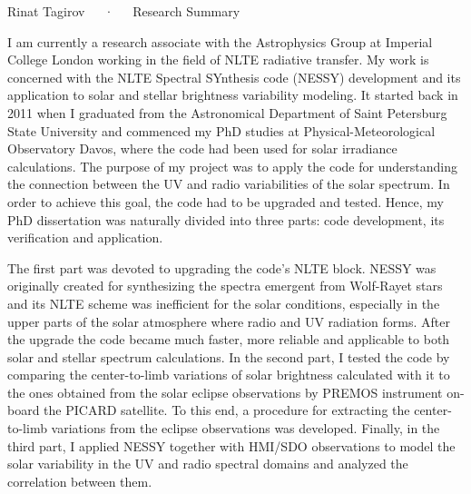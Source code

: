 \documentclass[11pt, a4paper]{awesome-cv}
\begin{document}

\makecvfooter
  {}
  {Rinat Tagirov~~~·~~~Research Summary}
  {}


\begin{cvletter}


I am currently a research associate with the Astrophysics Group at Imperial College London
working in the field of NLTE radiative transfer.
My work is concerned with the NLTE Spectral SYnthesis code (NESSY) development and its application to
solar and stellar brightness variability modeling.
It started back in 2011 when I graduated from the Astronomical Department of Saint Petersburg State University
and commenced my PhD studies at Physical-Meteorological Observatory Davos,
where the code had been used for solar irradiance calculations.
The purpose of my project was to apply the code for understanding the connection between the UV and radio variabilities of the solar spectrum.
In order to achieve this goal, the code had to be upgraded and tested.
Hence, my PhD dissertation was naturally divided into three parts: code development, its verification and application.

The first part was devoted to upgrading the code's NLTE block.
NESSY was originally created for synthesizing the spectra emergent from Wolf-Rayet stars and its NLTE scheme
was inefficient for the solar conditions, especially in the upper parts of the solar atmosphere
where radio and UV radiation forms. After the upgrade the code became much faster, more reliable 
and applicable to both solar and stellar spectrum calculations.
In the second part, I tested the code by comparing the center-to-limb variations of solar brightness calculated with it
to the ones obtained from the solar eclipse observations by PREMOS instrument on-board the PICARD satellite.
To this end, a procedure for extracting the center-to-limb variations from the eclipse observations was developed.
Finally, in the third part, I applied NESSY together with HMI/SDO observations to model the solar variability in the UV and radio
spectral domains and analyzed the correlation between them.


\end{cvletter}
\end{document}
